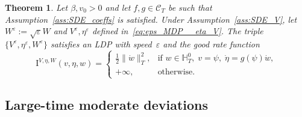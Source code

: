 \documentclass{amsart}[11pt]
\numberwithin{equation}{section}
\newtheorem{theorem}{Theorem}%
\numberwithin{theorem}{subsection}
\numberwithin{proposition}{subsection}
\numberwithin{definition}{subsection}
\numberwithin{lemma}{subsection}
\numberwithin{assumption}{subsection}
\newcommand{\Cc}{\mathcal{C}}
\newcommand{\HH}{\mathbb{H}}
\newcommand{\II}{\mathrm{I}}
\newcommand{\eps}{\varepsilon}
\begin{document}
\begin{theorem}\label{mdp-small-time}
Let $\beta, v_0>0$ and let $f, g \in \Cc_T$ be such that Assumption~\ref{ass:SDE_coeffs} is satisfied.
Under Assumption~\ref{ass:SDE_V}, 
let $W^{\eps} := \sqrt{\eps}W$ and $V^\eps, \eta^{\eps}$ defined in~\eqref{eq:eps_MDP__eta_V}.
The triple
$\{V^\eps, \eta^\eps,W^\eps\}$ satisfies an LDP with speed~$\eps$ and the good rate function
\begin{equation*}
\II^{V,\eta,W}(v,\eta,w) = 
\left\{
\begin{array}{ll}
\displaystyle \frac{1}{2}\|\dot{w}\|_{T}^2, & \text{if }
\displaystyle 
w \in \HH_T^0,\;
v = \psi,\;
\dot{\eta} =  g(\psi)\dot{w},\\
+\infty, & \text{otherwise}.
\end{array}
\right.
\end{equation*}
\end{theorem}


\subsection{Large-time moderate deviations} \label{sec:largetimeMDP}
\end{document}

